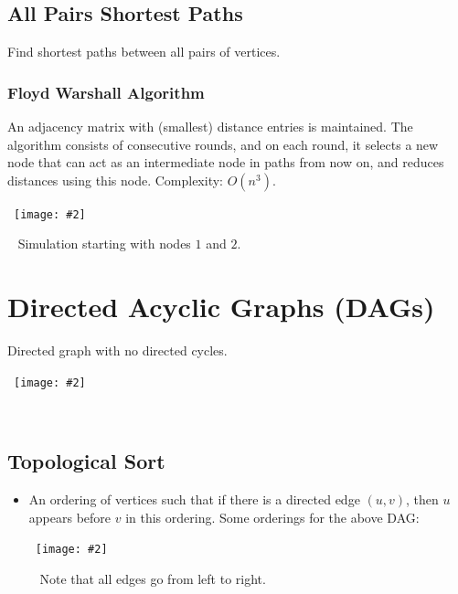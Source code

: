 \documentclass{article}
\newcommand{\image}[2]{\
    \begin{center}\
        \texttt{[image: \#2]}\
    \end{center}\
}
\begin{document}
\begin{sloppypar}
    \subsection{All Pairs Shortest Paths}
    Find shortest paths between all pairs of vertices.
    \subsubsection{Floyd Warshall Algorithm}
    An adjacency matrix with (smallest) distance entries is maintained. The algorithm consists of consecutive rounds, and on each round, it selects a new node that can act as an intermediate node in paths from now on, and reduces distances using this node. Complexity: $O(n^3)$.
    \image{0.8}{../images/floyd-warshall.png}
    Simulation starting with nodes $1$ and $2$.

    \newpage

    \section{Directed Acyclic Graphs (DAGs)}
    
    Directed graph with no directed cycles.
    \image{0.3}{../images/dag.png}

    \subsection{Topological Sort}
    \begin{itemize}
        \item An ordering of vertices such that if there is a directed edge $(u,v)$, then $u$ appears before $v$ in this ordering. Some orderings for the above DAG:
        \image{0.6}{../images/topsorts.png}
        Note that all edges go from left to right.
    \end{itemize}

\end{sloppypar}
\end{document}
